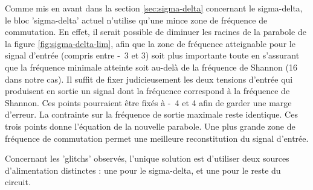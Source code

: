 Comme mis en avant dans la section \ref{sec:sigma-delta} concernant le
sigma-delta, le bloc 'sigma-delta' actuel n'utilise qu'une mince zone
de fréquence de commutation. En effet, il serait possible de diminuer
les racines de la parabole de la figure \ref{fig:sigma-delta-lim}, 
afin que la zone de fréquence atteignable pour le signal d'entrée 
(compris entre \unit{-3}{\volt} et \unit{3}{\volt})
soit plus importante toute en s'assurant que la fréquence minimale
atteinte soit au-delà de la fréquence de Shannon (\unit{16}{\kilo\hertz} dans
notre cas). Il suffit de fixer judicieusement les deux tensions d'entrée qui produisent
en sortie un signal dont la fréquence correspond à la fréquence de Shannon. 
Ces points pourraient être fixés à \unit{-4}{\volt} et \unit{4}{\volt}
afin de garder une marge d'erreur. La contrainte sur la fréquence
de sortie maximale reste identique.
Ces trois points donne l'équation de la nouvelle parabole. Une plus 
grande zone de fréquence de commutation permet une meilleure reconstitution
du signal d'entrée.

Concernant les 'glitchs' observés, l'unique solution est d'utiliser deux 
sources d'alimentation distinctes : une pour le sigma-delta, et une pour le reste du circuit.

